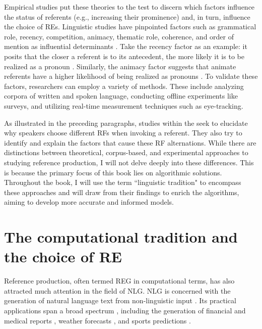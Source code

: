Empirical studies put these theories to the test to discern which factors influence the status of referents (e.g., increasing their prominence) and, in turn, influence the choice of REs. Linguistic studies have pinpointed factors such as grammatical role, recency, competition, animacy, thematic role, coherence, and order of mention as influential determinants \citep{Stevenson1994,Brennan1995, Arnold2001,arnold2007effect,kehler2008coherence, Kaiser2011, fukumura2011effect}. 
Take the recency factor as an example: it posits that the closer a referent is to its antecedent, the more likely it is to be realized as a pronoun \citep{givon1992grammar}. Similarly, the animacy factor suggests that animate referents have a higher likelihood of being realized as pronouns \citep{fukumura2011effect}. To validate these factors, researchers can employ a variety of methods. These include analyzing corpora of written and spoken language, conducting offline experiments like surveys, and utilizing real-time measurement techniques such as eye-tracking.


As illustrated in the preceding paragraphs, studies within the  seek to elucidate why speakers choose different RFs when invoking a referent. They also try to identify and explain the factors that cause these RF alternations. While there are distinctions between theoretical, corpus-based, and experimental approaches to studying reference production, I will not delve deeply into these differences. This is because the primary focus of this book lies on algorithmic solutions. Throughout the book, I will use the term ``linguistic tradition" to encompass these approaches and will draw from their findings to enrich the \context algorithms, aiming to develop more accurate and informed models.

\section{The computational tradition and the choice of RE}\label{sec:comptradition}

Reference production, often termed REG in computational terms, has also attracted much attention in the field of NLG. NLG is concerned with the generation of natural language text from non-linguistic input \citep{krahmer2012computational, gatt2018survey}. Its practical applications span a broad spectrum \citep{mei-etal-2016-talk,reiter-2017-commercial}, including the generation of financial and medical reports \citep{gatt2009data}, weather forecasts \citep{Reiter2005}, and sports predictions \citep{van-der-lee-etal-2017-pass}. 

